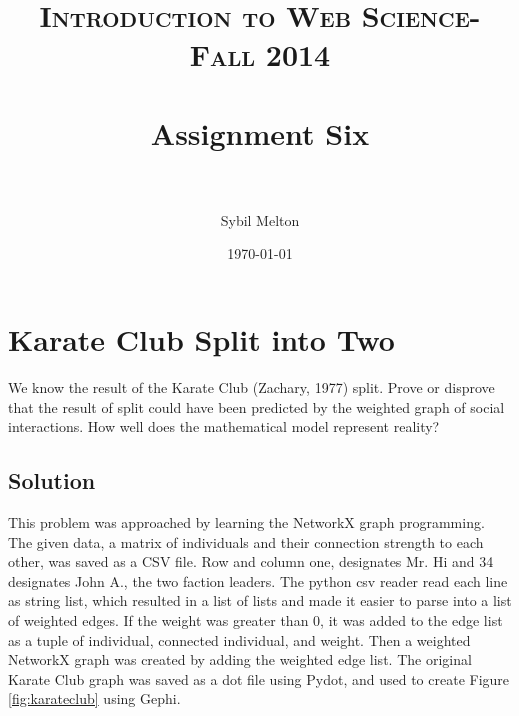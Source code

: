 \documentclass[paper=a4, fontsize=11pt]{scrartcl} %
\title{	
\normalfont \normalsize 
\textsc{Introduction to Web Science- Fall 2014} \\ [25pt] %
\horrule{0.5pt} \\[0.4cm] %
\huge Assignment Six \\ %
\horrule{2pt} \\[0.5cm] %
}
\author{Sybil Melton} %
\date{\normalsize\today} %
\numberwithin{equation}{section} %
\numberwithin{figure}{section} %
\numberwithin{table}{section} %
\begin{document}
\maketitle %
\newpage
\tableofcontents
\listoffigures
\lstlistoflistings
\newpage

\section{Karate Club Split into Two}

We know the result of the Karate Club (Zachary, 1977) split.
Prove or disprove that the result of split could have been predicted
by the weighted graph of social interactions.  How well does the
mathematical model represent reality?

\subsection{Solution}
This problem was approached by learning the NetworkX graph programming.
The given data, a matrix of individuals and their connection strength to each other, was saved as a CSV file\cite{bib:zach-data}.
Row and column one, designates Mr. Hi and 34 designates John A., the two faction leaders.\cite{bib:zach-paper}
The python csv reader read each line as string list, which resulted in a list of lists and made it easier to parse into a list of weighted edges.\cite{bib:csv}
If the weight was greater than 0, it was added to the edge list as a tuple of individual, connected individual, and weight.
Then a weighted NetworkX graph was created by adding the weighted edge list.
The original Karate Club graph was saved as a dot file using Pydot, and used to create Figure \ref{fig:karateclub} using Gephi.\cite{bib:nx-tut}
\end{document}

